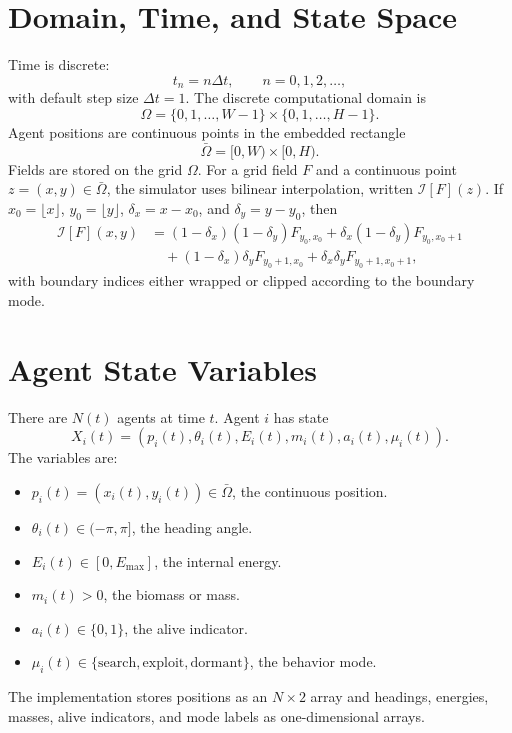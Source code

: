 \documentclass[11pt]{article}
\begin{document}
\section{Domain, Time, and State Space}
Time is discrete:
\begin{equation}
  t_n = n\Delta t,\qquad n=0,1,2,\ldots,
\end{equation}
with default step size $\Delta t=1$. The discrete computational domain is
\begin{equation}
  \Omega = \{0,1,\ldots,W-1\}\times \{0,1,\ldots,H-1\}.
\end{equation}
Agent positions are continuous points in the embedded rectangle
\begin{equation}
  \bar{\Omega}=[0,W)\times[0,H).
\end{equation}
Fields are stored on the grid $\Omega$. For a grid field $F$ and a continuous
point $z=(x,y)\in\bar{\Omega}$, the simulator uses bilinear interpolation,
written $\mathcal{I}[F](z)$. If $x_0=\lfloor x\rfloor$, $y_0=\lfloor y\rfloor$,
$\delta_x=x-x_0$, and $\delta_y=y-y_0$, then
\begin{align}
  \mathcal{I}[F](x,y)
  &=
  (1-\delta_x)(1-\delta_y)F_{y_0,x_0}
  +\delta_x(1-\delta_y)F_{y_0,x_0+1} \nonumber\\
  &\quad +(1-\delta_x)\delta_y F_{y_0+1,x_0}
  +\delta_x\delta_y F_{y_0+1,x_0+1},
\end{align}
with boundary indices either wrapped or clipped according to the boundary mode.

\section{Agent State Variables}
There are $N(t)$ agents at time $t$. Agent $i$ has state
\begin{equation}
  X_i(t)=\left(p_i(t),\theta_i(t),E_i(t),m_i(t),a_i(t),\mu_i(t)\right).
\end{equation}
The variables are:
\begin{itemize}
  \item $p_i(t)=(x_i(t),y_i(t))\in\bar{\Omega}$, the continuous position.
  \item $\theta_i(t)\in(-\pi,\pi]$, the heading angle.
  \item $E_i(t)\in[0,E_{\max}]$, the internal energy.
  \item $m_i(t)>0$, the biomass or mass.
  \item $a_i(t)\in\{0,1\}$, the alive indicator.
  \item $\mu_i(t)\in\{\mathrm{search},\mathrm{exploit},\mathrm{dormant}\}$,
  the behavior mode.
\end{itemize}
The implementation stores positions as an $N\times 2$ array and headings,
energies, masses, alive indicators, and mode labels as one-dimensional arrays.
\end{document}
